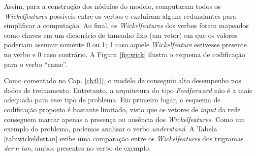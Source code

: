 Assim, para a construção dos nódulos do modelo, \cite{rumelhart:1986} computaram todos os \textit{Wickelfeatures} possíveis entre os verbos e excluíram alguns redundantes para simplificar a computação. Ao final, os \textit{Wickelfeatures} dos verbos foram mapeados como chaves em um dicionário de tamanho fixo (um vetor) em que os valores poderiam assumir somente 0 ou 1; 1 caso aquele \textit{Wickelfeature} estivesse presente no verbo e 0 caso contrário. A Figura \ref{fig:wick} ilustra o esquema de codificação para o verbo “came”. 



Como comentado no Cap. \ref{ch:01}, o modelo de \cite{rumelhart:1986} conseguiu alto desempenho nos dados de treinamento. Entretanto, a arquitetura do tipo \textit{Feedforward} não é a mais adequada para esse tipo de problema. Em primeiro lugar, o esquema de codificação proposto é bastante limitado, visto que os vetores de \textit{input} da rede conseguem marcar apenas a presença ou ausência dos \textit{Wickelfeatures}. Como um exemplo do problema, podemos analisar o verbo  \textit{understand}. A Tabela \ref{tab:wickeldertan} exibe uma comparação entre os \textit{Wickelfeatures} dos trigramas \textit{der} e \textit{tan}, ambos presentes no verbo de exemplo.

